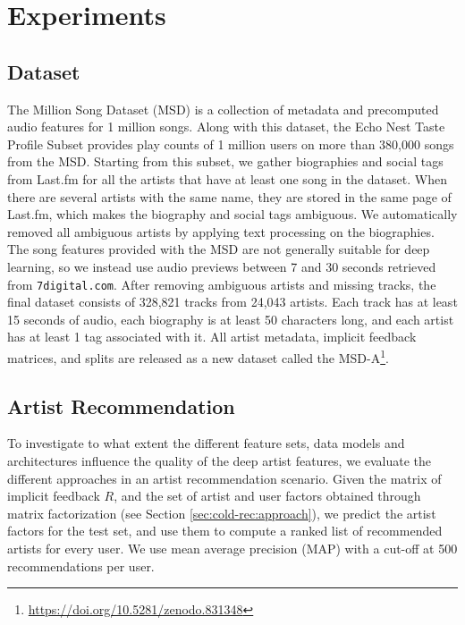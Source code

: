 
\section{Experiments}\label{sec:cold-rec:experiments}

\subsection{Dataset}\label{sec:cold-rec:dataset}

The Million Song Dataset (MSD) \cite{McFee2012} is a collection of metadata and precomputed audio features for 1 million songs. 
Along with this dataset, the Echo Nest Taste Profile Subset \cite{Bertin-Mahieux2011} provides play counts of 1 million users on more than 380,000 songs from the MSD.
Starting from this subset, we gather biographies and social tags from Last.fm for all the artists that have at least one song in the dataset.
When there are several artists with the same name, they are stored in the same page of Last.fm, which makes the biography and social tags ambiguous. 
We automatically removed all ambiguous artists by applying text processing on the biographies. 
The song features provided with the MSD are not generally suitable for deep learning, so we instead use audio previews between 7 and 30 seconds retrieved from \texttt{7digital.com}.
After removing ambiguous artists and missing tracks, the final dataset consists of 328,821 tracks from 24,043 artists. 
Each track has at least 15 seconds of audio, each biography is at least 50 characters long, and each artist has at least 1 tag associated with it. All artist metadata, implicit feedback matrices, and splits are released as a new dataset called the MSD-A\footnote{\url{https://doi.org/10.5281/zenodo.831348}}.

\subsection{Artist Recommendation}
\label{sec:cold-rec:artist-rec}

To investigate to what extent the different feature sets, data models and architectures influence the quality of the deep artist features, we evaluate the different approaches in an artist recommendation scenario. Given the matrix of implicit feedback $R$, and the set of artist and user factors obtained through matrix factorization (see Section \ref{sec:cold-rec:approach}), we predict the artist factors for the test set, and use them to compute a ranked list of recommended artists for every user. We use mean average precision (MAP) with a cut-off at 500 recommendations per user. 

